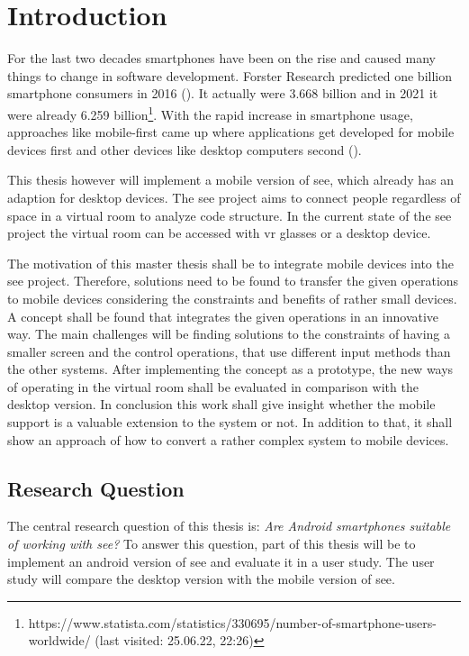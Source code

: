 \section{Introduction}
\label{sec:introduction}
For the last two decades smartphones have been on the rise and caused many things to change in software development.
Forster Research predicted one billion smartphone consumers in 2016 (\cite{schadler2012mobile}).
It actually were 3.668 billion and in 2021 it were already 6.259 billion\footnote{https://www.statista.com/statistics/330695/number-of-smartphone-users-worldwide/ (last visited: 25.06.22, 22:26)}.
With the rapid increase in smartphone usage, approaches like mobile-first came up where applications get developed for mobile devices first and other devices like desktop computers second (\cite{wroblewski2012mobile}).

This thesis however will implement a mobile version of \gls{see}, which already has an adaption for desktop devices.
The \gls{see} project aims to connect people regardless of space in a virtual room to analyze code structure.  
In the current state of the \gls{see} project the virtual room can be accessed with \gls{vr} glasses or a desktop device.

The motivation of this master thesis shall be to integrate mobile devices into the \gls{see} project. 
Therefore, solutions need to be found to transfer the given operations to mobile devices considering the constraints and benefits of rather small devices.
A concept shall be found that integrates the given operations in an innovative way. 
The main challenges will be finding solutions to the constraints of having a smaller screen and the control operations, that use different input methods than the other systems. 
After implementing the concept as a prototype, the new ways of operating in the virtual room shall be evaluated in comparison with the desktop version. 
In conclusion this work shall give insight whether the mobile support is a valuable extension to the system or not. 
In addition to that, it shall show an approach of how to convert a rather complex system to mobile devices.

\subsection{Research Question}
\label{research}
The central research question of this thesis is: 
\textit{Are Android smartphones suitable of working with \gls{see}?}
To answer this question, part of this thesis will be to implement an \gls{android} version of \gls{see} and evaluate it in a user study.
The user study will compare the desktop version with the mobile version of \gls{see}.


